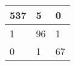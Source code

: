 \begin{tabular}{lll}
\hline
  537 & 5 & 0 \\
\hline
  1 & 96 & 1 \\
\hline
  0 & 1 & 67 \\
\hline
\end{tabular}
